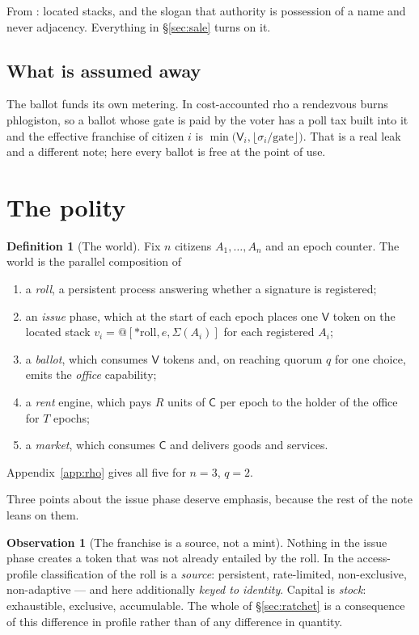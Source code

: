 \documentclass[11pt]{article}
\makeatletter
\theoremstyle{plain}
\theoremstyle{definition}
\newtheorem{definition}[theorem]{Definition}
\newtheorem{observation}[theorem]{Observation}
\theoremstyle{remark}
\newcommand{\Sig}{\Sigma}
\newcommand{\Vt}{\mathsf{V}}
\newcommand{\Ct}{\mathsf{C}}
\newcommand{\quo}[1]{@#1}
\newcommand{\drop}[1]{*#1}
\makeatother
\begin{document}
From \cite{finrho}: located stacks, and the slogan that authority is possession
of a name and never adjacency. Everything in \S\ref{sec:sale} turns on it.

\subsection*{What is assumed away}

The ballot funds its own metering. In cost-accounted rho a rendezvous burns
phlogiston, so a ballot whose gate is paid by the voter has a poll tax built
into it and the effective franchise of citizen $i$ is
$\min\bigl(\Vt_i, \lfloor \sigma_i / \text{gate}\rfloor\bigr)$. That is a real
leak and a different note; here every ballot is free at the point of use.

\section{The polity}
\label{sec:polity}

\begin{definition}[The world]
Fix $n$ citizens $A_1,\dots,A_n$ and an epoch counter. The world is the
parallel composition of
\begin{enumerate}[label=(\roman*),leftmargin=2.2em]
\item a \emph{roll}, a persistent process answering whether a signature is
registered;
\item an \emph{issue} phase, which at the start of each epoch places one $\Vt$
token on the located stack $v_i = \quo{[\drop{\text{roll}}, e, \Sig(A_i)]}$ for
each registered $A_i$;
\item a \emph{ballot}, which consumes $\Vt$ tokens and, on reaching quorum $q$
for one choice, emits the \emph{office} capability;
\item a \emph{rent} engine, which pays $R$ units of $\Ct$ per epoch to the
holder of the office for $T$ epochs;
\item a \emph{market}, which consumes $\Ct$ and delivers goods and services.
\end{enumerate}
Appendix~\ref{app:rho} gives all five for $n=3$, $q=2$.
\end{definition}

Three points about the issue phase deserve emphasis, because the rest of the
note leans on them.

\begin{observation}[The franchise is a source, not a mint]
Nothing in the issue phase creates a token that was not already entailed by the
roll. In the access-profile classification of \cite[\S10]{scientist} the roll is
a \emph{source}: persistent, rate-limited, non-exclusive, non-adaptive --- and
here additionally \emph{keyed to identity}. Capital is \emph{stock}: exhaustible,
exclusive, accumulable. The whole of \S\ref{sec:ratchet} is a consequence of
this difference in profile rather than of any difference in quantity.
\end{observation}
\end{document}

